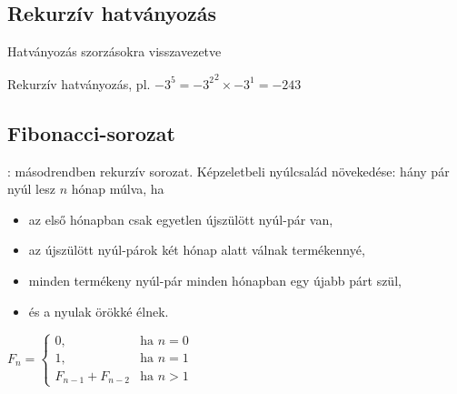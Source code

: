 \documentclass[usenames,dvipsnames,aspectratio=169]{beamer}
\begin{document}
\subsection{Rekurzív hatványozás}
\begin{frame}
  \scriptsize
  \begin{exampleblock}{ Hatványozás szorzásokra visszavezetve}
    \scriptsize
    \vspace{-.2cm}
    
    \vspace{-.2cm}
  \end{exampleblock}
  \begin{exampleblock}{ Rekurzív hatványozás, pl. $-3^5 = {-3^2}^2 \times -3^1 = 
-243$}
    \scriptsize
    \vspace{-.2cm}
    
    \vspace{-.2cm}
  \end{exampleblock}
\end{frame}

\subsection{Fibonacci-sorozat}
\begin{frame}
  : másodrendben rekurzív sorozat. Képzeletbeli nyúlcsalád növekedése: hány pár nyúl lesz $n$ hónap múlva, ha
  \begin{itemize}
    \item az első hónapban csak egyetlen újszülött nyúl-pár van,
    \item az újszülött nyúl-párok két hónap alatt válnak termékennyé,
    \item minden termékeny nyúl-pár minden hónapban egy újabb párt szül,
    \item és a nyulak örökké élnek.
  \end{itemize}
  \vfill
  $F_n = \left\{ \begin{array}{ll}
    0, & \textrm{ha $n=0$}\\
    1, & \textrm{ha $n=1$}\\
    F_{n-1} + F_{n-2} & \textrm{ha $n>1$}
  \end{array} \right.$
\end{frame}
\end{document}

